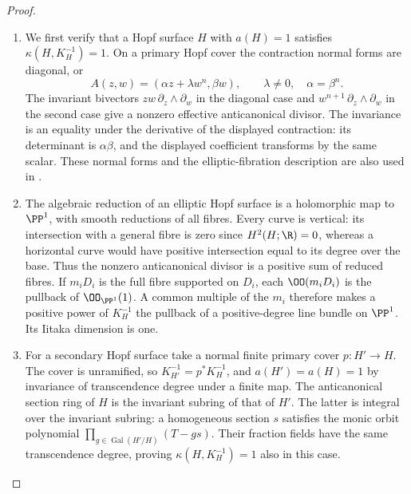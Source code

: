 \begin{proof}

\begin{enumerate}[label={$\langle1\rangle$\arabic*.},leftmargin=*]
\item We first verify that a Hopf surface $H$ with $a(H)=1$ satisfies
$\kappa(H,K_H^{-1})=1$. On a primary Hopf cover the contraction
normal forms are diagonal, or
\[
A(z,w)=(\alpha z+\lambda w^n,\beta w),\qquad
\lambda\ne0,\quad \alpha=\beta^n.
\]
The invariant bivectors $zw\,\partial_z\wedge\partial_w$ in the
diagonal case and $w^{n+1}\,\partial_z\wedge\partial_w$ in the
second case give a nonzero effective anticanonical divisor.
The invariance is an equality under the derivative of the
displayed contraction: its determinant is $\alpha\beta$, and
the displayed coefficient transforms by the same scalar.
These normal forms and the elliptic-fibration description are
also used in \cite[Proposition~3.1 and its proof]{SS2002}.

\item The algebraic reduction of an elliptic Hopf surface is a
holomorphic map to $\PP^1$, with smooth reductions of all fibres.
Every curve is vertical: its intersection with a general fibre
is zero since $H^2(H;\R)=0$, whereas a horizontal curve would
have positive intersection equal to its degree over the base.
Thus the nonzero anticanonical divisor is a positive sum of
reduced fibres. If $m_iD_i$ is the full fibre supported on
$D_i$, each $\OO(m_iD_i)$ is the pullback of $\OO_{\PP^1}(1)$.
A common multiple of the $m_i$ therefore makes a positive power
of $K_H^{-1}$ the pullback of a positive-degree line bundle on
$\PP^1$. Its Iitaka dimension is one.

\item For a secondary Hopf surface take a normal finite primary cover
$p:H'\to H$. The cover is unramified, so
$K_{H'}^{-1}=p^*K_H^{-1}$, and $a(H')=a(H)=1$ by invariance of
transcendence degree under a finite map. The anticanonical
section ring of $H$ is the invariant subring of that of $H'$.
The latter is integral over the invariant subring: a homogeneous
section $s$ satisfies the monic orbit polynomial
$\prod_{g\in\operatorname{Gal}(H'/H)}(T-gs)$. Their fraction
fields have the same transcendence degree, proving
$\kappa(H,K_H^{-1})=1$ also in this case.


\end{enumerate}
\end{proof}
